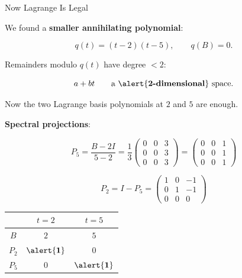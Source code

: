 \documentclass[10pt]{beamer}
\theoremstyle{definition}
\newcommand{\x}[1]{\alert{\textbf{#1}}}
\begin{document}
\begin{frame}[shrink=5]{Now Lagrange Is Legal}

We found a \x{smaller annihilating polynomial}:

$$q(t) = (t-2)(t-5), \qquad q(B)=0.$$

\vfill

Remainders modulo $q(t)$ have degree $<2$:

$$a + bt \qquad \text{a \x{2-dimensional} space.}$$

\vfill

Now the two Lagrange basis polynomials at $2$ and $5$ are enough.

\vfill\pause

\x{Spectral projections}:

$$P_5 = \frac{B - 2I}{5 - 2} = \frac{1}{3}\begin{pmatrix}0&0&3\\0&0&3\\0&0&3\end{pmatrix} = \begin{pmatrix}0&0&1\\0&0&1\\0&0&1\end{pmatrix}$$

$$P_2 = I - P_5 = \begin{pmatrix}1&0&-1\\0&1&-1\\0&0&0\end{pmatrix}$$

\vfill

\begin{center}
\renewcommand{\arraystretch}{1.3}
\begin{tabular}{c|cc}
 & $t = 2$ & $t = 5$ \\
\hline
$B$ & $2$ & $5$ \\
$P_2$ & $\x{1}$ & $0$ \\
$P_5$ & $0$ & $\x{1}$
\end{tabular}
\end{center}

\end{frame}
\end{document}
